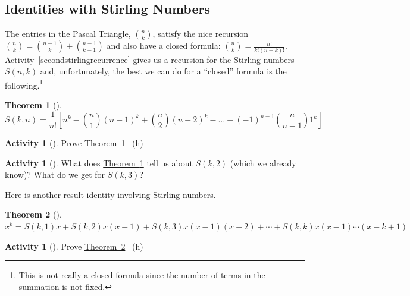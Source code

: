 \documentclass[10pt,]{book}
\theoremstyle{plain}
\newtheorem{theorem}{Theorem}[section]
\theoremstyle{definition}
\theoremstyle{definition}
\theoremstyle{definition}
\newtheorem{activity}[project]{Activity}
\numberwithin{equation}{chapter}
\begin{document}
\subsection[{Identities with Stirling Numbers}]{Identities with Stirling Numbers}\label{subsec-stirlingidentities}
\hypertarget{p-1440}{}%
The entries in the Pascal Triangle, \(\binom{n}{k}\), satisfy the nice recursion \(\binom{n}{k} = \binom{n - 1}{k} + \binom{n - 1}{k - 1}\) and also have a closed formula: \(\binom{n}{k} = \frac{n!}{k!(n - k)!}\). \hyperref[secondstirlingrecurrence]{Activity~\ref{secondstirlingrecurrence}} gives us a recursion for the Stirling numbers \(S(n,k)\) and, unfortunately, the best we can do for a ``closed'' formula is the following.\footnote{This is not really a closed formula since the number of terms in the summation is not fixed.\label{fn-19}}%
\begin{theorem}[{}]\label{thm-stirling-closed}
\hypertarget{p-1441}{}%
%
\begin{equation*}
S(k,n) = \frac{1}{n!}\left[n^{k} - \binom{n}{1} \left( n - 1 \right)^{k} + \binom{n}{2} \left( n - 2 \right)^{k} - \ldots + \left( - 1 \right)^{n - 1}\binom{n}{n - 1} 1^{k} \right] 
\end{equation*}
%
\end{theorem}
\begin{activity}[]\label{activity-278}
\hypertarget{p-1442}{}%
Prove \hyperref[thm-stirling-closed]{Theorem~\ref{thm-stirling-closed}}%
~{\tiny (h)}\end{activity}
\begin{activity}[]\label{activity-279}
\hypertarget{p-1446}{}%
What does \hyperref[thm-stirling-closed]{Theorem~\ref{thm-stirling-closed}} tell us about \(S(k, 2)\) (which we already know)?  What do we get for \(S(k,3)\)?%
\end{activity}
\hypertarget{p-1448}{}%
Here is another result identity involving Stirling numbers.%
\begin{theorem}[{}]\label{thm-stirling-polynomial}
\hypertarget{p-1449}{}%
\(x^{k} = S\left(k,1 \right)x + S\left(k,2 \right)x\left( x - 1 \right) + S\left(k,3 \right)x\left( x - 1 \right)\left( x - 2 \right) + \cdots
+ S\left(k,k \right)x\left( x - 1 \right)\cdots(x -k + 1)\)%
\end{theorem}
\begin{activity}[]\label{activity-280}
\hypertarget{p-1450}{}%
Prove \hyperref[thm-stirling-polynomial]{Theorem~\ref{thm-stirling-polynomial}}%
~{\tiny (h)}\end{activity}
\hypertarget{p-1453}{}%
\end{document}
